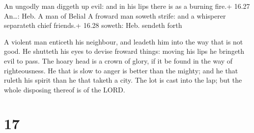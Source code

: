  An ungodly man diggeth up evil: and in his lips there is
as a burning fire.+ 16.27 An\ldots: Heb. A man of Belial  A
froward man soweth strife: and a whisperer separateth chief friends.+
16.28 soweth: Heb. sendeth forth

 A violent man enticeth his neighbour, and leadeth him into
the way that is not good.  He shutteth his eyes to devise
froward things: moving his lips he bringeth evil to pass. 
The hoary head is a crown of glory, if it be found in the way of
righteousness.  He that is slow to anger is better than the
mighty; and he that ruleth his spirit than he that taketh a city.
 The lot is cast into the lap; but the whole disposing
thereof is of the LORD.

\hypertarget{section-16}{%
\section{17}\label{section-16}}

